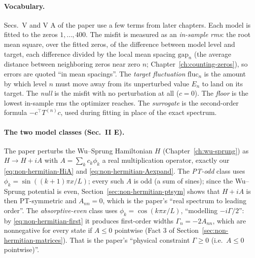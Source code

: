 \paragraph{Vocabulary.} Secs.~V and V A of the paper use a few terms from later chapters. Each model is fitted to the zeros $1,\dots,400$. The misfit is measured as an \emph{in-sample rms}: the root mean square, over the fitted zeros, of the difference between model level and target, each difference divided by the local mean spacing $\mathrm{gap}_n$ (the average distance between neighboring zeros near zero $n$; Chapter~\ref{ch:counting-zeros}), so errors are quoted ``in mean spacings''. The \emph{target fluctuation} $\mathrm{fluc}_n$ is the amount by which level $n$ must move away from its unperturbed value $E_n$ to land on its target. The \emph{null} is the misfit with no perturbation at all ($c=0$). The \emph{floor} is the lowest in-sample rms the optimizer reaches. The \emph{surrogate} is the second-order formula $-c^\top T^{(n)}c$, used during fitting in place of the exact spectrum.

\paragraph{The two model classes (Sec.~II E).} The paper perturbs the Wu--Sprung Hamiltonian $H$ (Chapter~\ref{ch:wu-sprung}) as $H\to H+iA$ with $A=\sum_kc_k\phi_k$ a real multiplication operator, exactly our \eqref{eq:non-hermitian-HiA} and \eqref{eq:non-hermitian-Aexpand}. The \emph{PT-odd} class uses $\phi_k=\sin((k+1)\pi x/L)$; every such $A$ is odd (a sum of sines); since the Wu--Sprung potential is even, Section~\ref{sec:non-hermitian-ptsym} shows that $H+iA$ is then PT-symmetric and $A_{nn}=0$, which is the paper's ``real spectrum to leading order''. The \emph{absorptive-even} class uses $\phi_k=\cos(k\pi x/L)$, ``modelling $-i\Gamma/2$'': by \eqref{eq:non-hermitian-first} it produces first-order widths $\Gamma_n=-2A_{nn}$, which are nonnegative for every state if $A\le0$ pointwise (Fact 3 of Section~\ref{sec:non-hermitian-matrices}). That is the paper's ``physical constraint $\Gamma\ge0$ (i.e.\ $A\le0$ pointwise)''.

